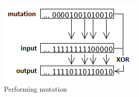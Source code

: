 \begin{figure}[H]
\includegraphics[width=\textwidth]{fpga/fig/mutation_perform.png}
\caption{Performing mutation}
\label{fig_mutation_perform}
\end{figure}


